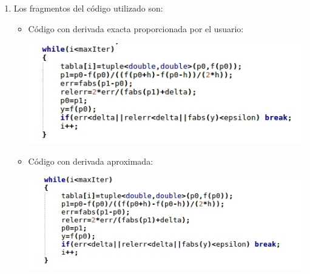\documentclass[10pt]{article}
\begin{document}
\begin{enumerate}
\item Los fragmentos del c\'odigo utilizado son:
\begin{itemize}
 \item C\'odigo con derivada exacta proporcionada por el usuario:
 \begin{center}
 \includegraphics[scale=0.8]{./code1.jpg}
\end{center}
\item C\'odigo con derivada aproximada:
\begin{center}
 \includegraphics[scale=0.8]{./code2.jpg}
\end{center}
\end{itemize}


\end{enumerate}
\end{document}
